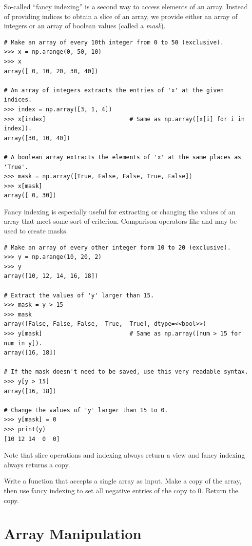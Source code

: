 So-called ``fancy indexing'' is a second way to access elements of an array.
Instead of providing indices to obtain a slice of an array, we provide either an array of integers or an array of boolean values (called a \emph{mask}).

\begin{lstlisting}
# Make an array of every 10th integer from 0 to 50 (exclusive).
>>> x = np.arange(0, 50, 10)
>>> x
array([ 0, 10, 20, 30, 40])

# An array of integers extracts the entries of 'x' at the given indices.
>>> index = np.array([3, 1, 4])
>>> x[index]                        # Same as np.array([x[i] for i in index]).
array([30, 10, 40])

# A boolean array extracts the elements of 'x' at the same places as 'True'.
>>> mask = np.array([True, False, False, True, False])
>>> x[mask]
array([ 0, 30])
\end{lstlisting}

Fancy indexing is especially useful for extracting or changing the values of an array that meet some sort of criterion.
Comparison operators like \li{<} and \li{==} may be used to create masks.

\begin{lstlisting}
# Make an array of every other integer form 10 to 20 (exclusive).
>>> y = np.arange(10, 20, 2)
>>> y
array([10, 12, 14, 16, 18])

# Extract the values of 'y' larger than 15.
>>> mask = y > 15
>>> mask
array([False, False, False,  True,  True], dtype=<<bool>>)
>>> y[mask]                         # Same as np.array([num > 15 for num in y]).
array([16, 18])

# If the mask doesn't need to be saved, use this very readable syntax.
>>> y[y > 15]
array([16, 18])

# Change the values of 'y' larger than 15 to 0.
>>> y[mask] = 0
>>> print(y)
[10 12 14  0  0]
\end{lstlisting}

Note that slice operations and indexing always return a view and fancy indexing always returns a copy.

\begin{problem} %
Write a function that accepts a single array as input.
Make a copy of the array, then use fancy indexing to set all negative entries of the copy to $0$.
Return the copy.
\end{problem}

\section*{Array Manipulation} %

